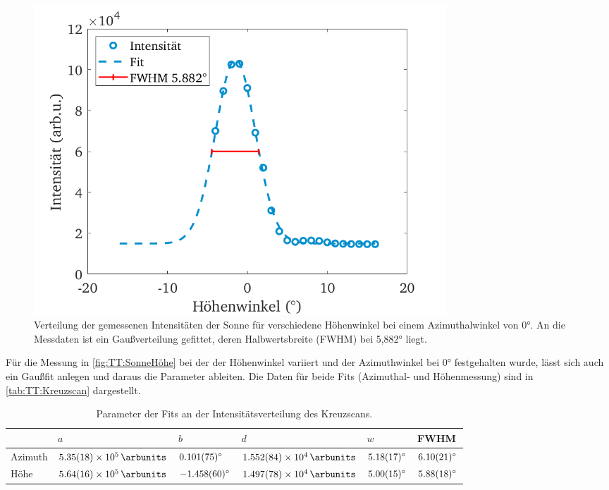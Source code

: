\documentclass[../../main.tex]{subfiles}
\begin{document}
    \begin{figure}[H]
        \centering
        \includegraphics[width=0.75\textwidth]{Bilddateien/Sun/Kreuz_He_FitFig_3000.png}
        \caption{Verteilung der gemessenen Intensitäten der Sonne für verschiedene Höhenwinkel bei einem Azimuthalwinkel von \ang{0}. An die Messdaten ist ein Gaußverteilung gefittet, deren Halbwertsbreite (FWHM) bei \ang{5,882} liegt.}
        \label{fig:TT:SonneHöhe}
    \end{figure}
    Für die Messung in \autoref{fig:TT:SonneHöhe} bei der der Höhenwinkel variiert und der Azimuthwinkel bei \ang{0} festgehalten wurde, lässt sich auch ein Gaußfit anlegen und daraus die Parameter ableiten. Die Daten für beide Fits (Azimuthal- und Höhenmessung) sind in \autoref{tab:TT:Kreuzscan} dargestellt.
    \begin{table}[H]
        \centering
        \begin{tabular}{l|l|l|l|l|l}
        \rowcolor[HTML]{A6E1F4} 
                & $a$                                & $b$                   & $d$                                  & $w$                & FWHM               \\ \hline
        Azimuth & $\SI{5.35+- 0.18e5}{\arbunits}$ & $\ang{0.101+-0.075}$ & $\SI{1.552+- 0.084e4}{\arbunits}$ & $\ang{5.18+-0.17}$ & $\ang{6.10+-0.21}$ \\ \hline
        Höhe    & $\SI{5.64 +- 0.16e5}{\arbunits}$ & $\ang{-1.458+-0.060}$  & $\SI{1.497 +- 0.078e4}{\arbunits}$ & $\ang{5.00+-0.15}$ & $\ang{5.88+-0.18}$
        \end{tabular}
        \caption{Parameter der Fits an der Intensitätsverteilung des Kreuzscans.}
        \label{tab:TT:Kreuzscan}
    \end{table}
\end{document}
